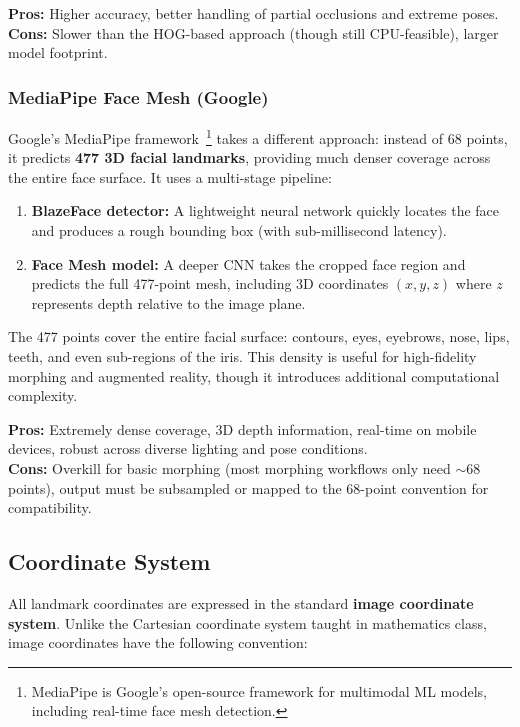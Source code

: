 \textbf{Pros:} Higher accuracy, better handling of partial occlusions and extreme poses. \\
\textbf{Cons:} Slower than the HOG-based approach (though still CPU-feasible), larger model footprint.

\subsubsection*{MediaPipe Face Mesh (Google)}

Google's MediaPipe framework~\footnote{MediaPipe is Google's open-source framework for multimodal ML models, including real-time face mesh detection.} takes a different approach: instead of 68 points, it predicts \textbf{477 3D facial landmarks}, providing much denser coverage across the entire face surface. It uses a multi-stage pipeline:

\begin{enumerate}
    \item \textbf{BlazeFace detector:} A lightweight neural network quickly locates the face and produces a rough bounding box (with sub-millisecond latency).
    \item \textbf{Face Mesh model:} A deeper CNN takes the cropped face region and predicts the full 477-point mesh, including 3D coordinates $(x, y, z)$ where $z$ represents depth relative to the image plane.
\end{enumerate}

The 477 points cover the entire facial surface: contours, eyes, eyebrows, nose, lips, teeth, and even sub-regions of the iris. This density is useful for high-fidelity morphing and augmented reality, though it introduces additional computational complexity.

\textbf{Pros:} Extremely dense coverage, 3D depth information, real-time on mobile devices, robust across diverse lighting and pose conditions. \\
\textbf{Cons:} Overkill for basic morphing (most morphing workflows only need $\sim$68 points), output must be subsampled or mapped to the 68-point convention for compatibility.

\subsection{Coordinate System}

All landmark coordinates are expressed in the standard \textbf{image coordinate system}. Unlike the Cartesian coordinate system taught in mathematics class, image coordinates have the following convention:

